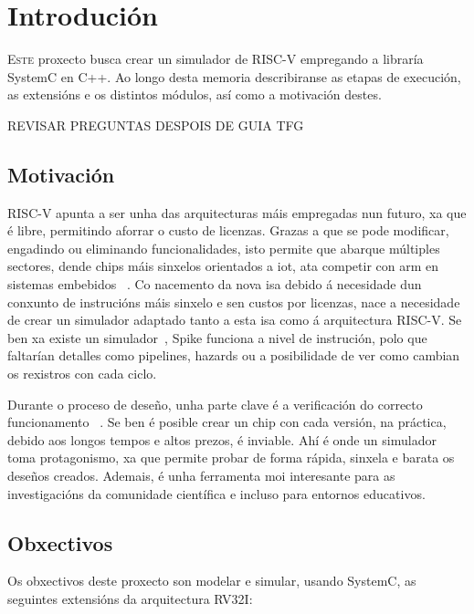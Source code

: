 \chapter{Introdución}
\label{chap:introducion}

\lettrine{E}{ste} proxecto busca crear un simulador de RISC-V empregando a libraría SystemC en C++. Ao longo desta memoria describiranse as etapas de execución, as extensións e os distintos módulos, así como a motivación destes.

 REVISAR PREGUNTAS DESPOIS DE GUIA TFG
 




\section{Motivación}
\label{sec:motivación}
RISC-V apunta a ser unha das arquitecturas máis empregadas nun futuro, xa que é libre, permitindo aforrar o custo de licenzas. Grazas a que se pode modificar, engadindo ou eliminando funcionalidades, isto permite que abarque múltiples sectores, dende \gls{chips} máis sinxelos orientados a \acrfull{iot}, ata competir con \acrfull{arm} en sistemas embebidos ~\cite{RISCV_IoT,RISCV_vsARM}. Co nacemento da nova \acrfull{isa} debido á necesidade dun conxunto de instrucións máis sinxelo e sen custos por licenzas, nace a necesidade de crear un simulador adaptado tanto a esta \acrshort{isa} como á arquitectura RISC-V. Se ben xa existe un simulador~\cite{sim_spike}, Spike funciona a nivel de instrución, polo que faltarían detalles como pipelines, \gls{hazards} ou a posibilidade de ver como cambian os rexistros con cada ciclo.

Durante o proceso de deseño, unha parte clave é a verificación do correcto funcionamento ~\cite{ChipVerify_verification,RISCV_verification}. Se ben é posible crear un chip con cada versión, na práctica, debido aos longos tempos e altos prezos, é inviable. Ahí é onde un simulador toma protagonismo, xa que permite probar de forma rápida, sinxela e barata os deseños creados. Ademais, é unha ferramenta moi interesante para as investigacións da comunidade científica e incluso para entornos educativos.

\section{Obxectivos}
\label{sec:obxectivos}
Os obxectivos deste proxecto son modelar e simular, usando SystemC, as seguintes extensións da arquitectura RV32I: 

